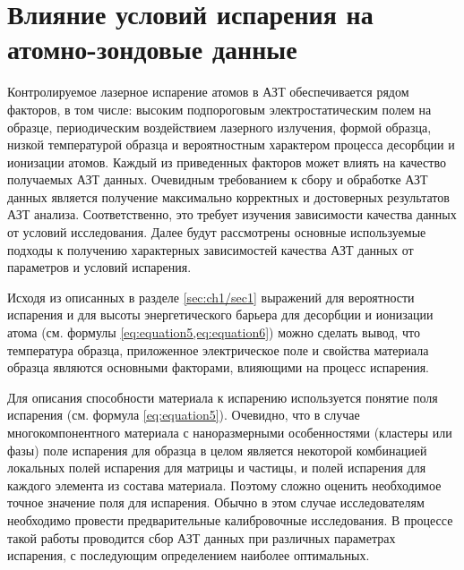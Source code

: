 \section{Влияние условий испарения на атомно-зондовые данные}\label{sec:ch1/sec5} 

Контролируемое лазерное испарение атомов в АЗТ обеспечивается  рядом факторов, в том числе: высоким подпороговым электростатическим полем на образце, периодическим воздействием лазерного излучения, формой образца, низкой температурой образца и вероятностным характером процесса десорбции и ионизации атомов. Каждый из приведенных факторов может влиять на качество получаемых АЗТ данных. Очевидным требованием к сбору и обработке АЗТ данных является получение максимально корректных и достоверных результатов АЗТ анализа. Соответственно, это требует изучения  зависимости качества данных от условий исследования. Далее будут рассмотрены основные используемые подходы к получению характерных зависимостей качества АЗТ данных от параметров и условий испарения.

Исходя из описанных в разделе \cref{sec:ch1/sec1} выражений для вероятности испарения и для высоты энергетического барьера для десорбции и ионизации атома (см. формулы  \cref{eq:equation5,eq:equation6}) можно сделать вывод, что температура образца, приложенное электрическое поле и свойства материала образца являются основными факторами, влияющими на процесс испарения.

Для описания способности материала к испарению используется понятие поля испарения \cite{Vurpillot16} (см. формула \cref{eq:equation5}). Очевидно, что в случае многокомпонентного материала с наноразмерными особенностями (кластеры или фазы) поле испарения для образца в целом является некоторой комбинацией локальных полей испарения для матрицы и частицы, и полей испарения для каждого элемента из состава материала. Поэтому сложно оценить необходимое точное значение поля для испарения. Обычно в этом случае исследователям необходимо провести предварительные калибровочные исследования. В процессе такой работы проводится сбор АЗТ данных при различных параметрах испарения, с последующим определением наиболее оптимальных. 

